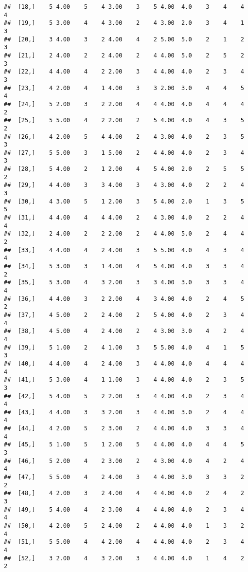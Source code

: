 \documentclass[]{article}
\begin{document}
\begin{verbatim}
##  [18,]    5 4.00    5    4 3.00    3    5 4.00  4.0    3    4    4    4
##  [19,]    5 3.00    4    4 3.00    2    4 3.00  2.0    3    4    1    3
##  [20,]    3 4.00    3    2 4.00    4    2 5.00  5.0    2    1    2    3
##  [21,]    2 4.00    2    2 4.00    2    4 4.00  5.0    2    5    2    3
##  [22,]    4 4.00    4    2 2.00    3    4 4.00  4.0    2    3    4    3
##  [23,]    4 2.00    4    1 4.00    3    3 2.00  3.0    4    4    5    4
##  [24,]    5 2.00    3    2 2.00    4    4 4.00  4.0    4    4    4    2
##  [25,]    5 5.00    4    2 2.00    2    5 4.00  4.0    4    3    5    2
##  [26,]    4 2.00    5    4 4.00    2    4 3.00  4.0    2    3    5    3
##  [27,]    5 5.00    3    1 5.00    2    4 4.00  4.0    2    3    4    3
##  [28,]    5 4.00    2    1 2.00    4    5 4.00  2.0    2    5    5    2
##  [29,]    4 4.00    3    3 4.00    3    4 3.00  4.0    2    2    4    3
##  [30,]    4 3.00    5    1 2.00    3    5 4.00  2.0    1    3    5    5
##  [31,]    4 4.00    4    4 4.00    2    4 3.00  4.0    2    2    4    4
##  [32,]    2 4.00    2    2 2.00    2    4 4.00  5.0    2    4    4    2
##  [33,]    4 4.00    4    2 4.00    3    5 5.00  4.0    4    3    4    4
##  [34,]    5 3.00    3    1 4.00    4    5 4.00  4.0    3    3    4    2
##  [35,]    5 3.00    4    3 2.00    3    3 4.00  3.0    3    3    4    4
##  [36,]    4 4.00    3    2 2.00    4    3 4.00  4.0    2    4    5    2
##  [37,]    4 5.00    2    2 4.00    2    5 4.00  4.0    2    3    4    4
##  [38,]    4 5.00    4    2 4.00    2    4 3.00  3.0    4    2    4    4
##  [39,]    5 1.00    2    4 1.00    3    5 5.00  4.0    4    1    5    3
##  [40,]    4 4.00    4    2 4.00    3    4 4.00  4.0    4    4    4    4
##  [41,]    5 3.00    4    1 1.00    3    4 4.00  4.0    2    3    5    3
##  [42,]    5 4.00    5    2 2.00    3    4 4.00  4.0    2    3    4    4
##  [43,]    4 4.00    3    3 2.00    3    4 4.00  3.0    2    4    4    4
##  [44,]    4 2.00    5    2 3.00    2    4 4.00  4.0    3    3    4    4
##  [45,]    5 1.00    5    1 2.00    5    4 4.00  4.0    4    4    5    3
##  [46,]    5 2.00    4    2 3.00    2    4 3.00  4.0    4    2    4    4
##  [47,]    5 5.00    4    2 4.00    3    4 4.00  3.0    3    3    2    2
##  [48,]    4 2.00    3    2 4.00    4    4 4.00  4.0    2    4    2    3
##  [49,]    5 4.00    4    2 3.00    4    4 4.00  4.0    2    3    4    4
##  [50,]    4 2.00    5    2 4.00    2    4 4.00  4.0    1    3    2    4
##  [51,]    5 5.00    4    4 2.00    4    4 4.00  4.0    2    3    4    4
##  [52,]    3 2.00    4    3 2.00    3    4 4.00  4.0    1    4    2    2

\end{verbatim}
\end{document}
